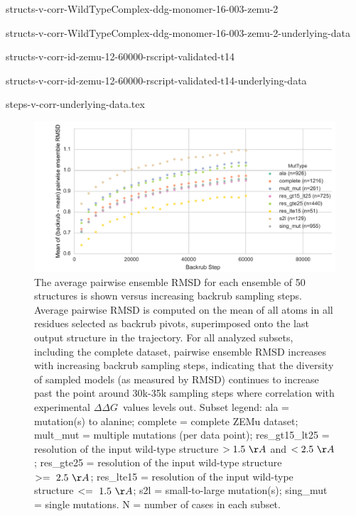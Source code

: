 \documentclass{article}
\newcommand\ddg{$\Delta\Delta G$}
\begin{document}
{structs-v-corr-WildTypeComplex-ddg-monomer-16-003-zemu-2}
\clearpage
\begin{landscape}
{structs-v-corr-WildTypeComplex-ddg-monomer-16-003-zemu-2-underlying-data}
\end{landscape}
\clearpage

{structs-v-corr-id-zemu-12-60000-rscript-validated-t14}
\clearpage
\begin{landscape}
{structs-v-corr-id-zemu-12-60000-rscript-validated-t14-underlying-data}
\end{landscape}
\clearpage

{steps-v-corr-underlying-data.tex}

\begin{figure}
  \centering
  \includegraphics[width=\textwidth,keepaspectratio]{figures/t14-mean-ensemble-error.pdf}
  \caption{
    The average pairwise ensemble RMSD for each ensemble of 50 structures is shown versus increasing backrub sampling steps. Average pairwise RMSD is computed on the mean of all atoms in all residues selected as backrub pivots, superimposed onto the last output structure in the trajectory. For all analyzed subsets, including the complete dataset, pairwise ensemble RMSD increases with increasing backrub sampling steps, indicating that the diversity of sampled models (as measured by RMSD) continues to increase past the point around 30k-35k sampling steps where correlation with experimental \ddg\ values levels out. Subset legend: ala = mutation(s) to alanine; complete = complete ZEMu dataset; mult\_mut = multiple mutations (per data point); res\_gt15\_lt25 = resolution of the input wild-type structure $> 1.5\ \AA$ and $< 2.5\ \AA$; res\_gte25 = resolution of the input wild-type structure $>=\ 2.5\ \AA$; res\_lte15 = resolution of the input wild-type structure $<=\ 1.5\ \AA$; s2l = small-to-large mutation(s); sing\_mut = single mutations. N = number of cases in each subset.
  } \label{fig:t14-mean-ensemble}
\end{figure}
\end{document}
